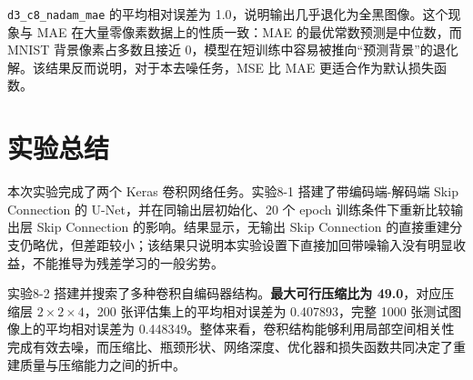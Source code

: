 \documentclass[10.5pt]{config}
\begin{document}
\texttt{d3\_c8\_nadam\_mae} 的平均相对误差为 1.0，说明输出几乎退化为全黑图像。这个现象与 MAE 在大量零像素数据上的性质一致：MAE 的最优常数预测是中位数，而 MNIST 背景像素占多数且接近 0，模型在短训练中容易被推向“预测背景”的退化解。该结果反而说明，对于本去噪任务，MSE 比 MAE 更适合作为默认损失函数。

\section{实验总结}

本次实验完成了两个 Keras 卷积网络任务。实验8-1 搭建了带编码端-解码端 Skip Connection 的 U-Net，并在同输出层初始化、20 个 epoch 训练条件下重新比较输出层 Skip Connection 的影响。结果显示，无输出 Skip Connection 的直接重建分支仍略优，但差距较小；该结果只说明本实验设置下直接加回带噪输入没有明显收益，不能推导为残差学习的一般劣势。

实验8-2 搭建并搜索了多种卷积自编码器结构。\textbf{最大可行压缩比为 49.0}，对应压缩层 \textbf{$2\times2\times4$}，200 张评估集上的平均相对误差为 0.407893，完整 1000 张测试图像上的平均相对误差为 0.448349。整体来看，卷积结构能够利用局部空间相关性完成有效去噪，而压缩比、瓶颈形状、网络深度、优化器和损失函数共同决定了重建质量与压缩能力之间的折中。
\end{document}
